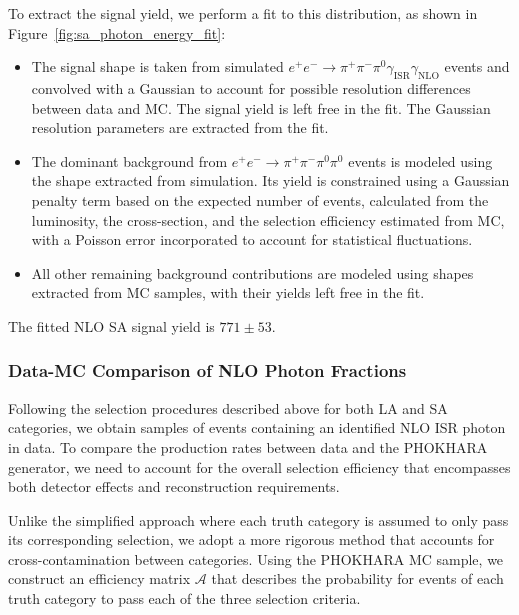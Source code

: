 To extract the signal yield, we perform a fit to this distribution, as shown in Figure~\ref{fig:sa_photon_energy_fit}:
\begin{itemize}
    \item The signal shape is taken from simulated \(e^+e^- \to \pi^+\pi^-\pi^0\gamma_{\text{ISR}}\gamma_{\text{NLO}}\) events and convolved with a Gaussian to account for possible resolution differences between data and MC. The signal yield is left free in the fit. The Gaussian resolution parameters are extracted from the fit.
    \item The dominant background from \(e^+e^- \to \pi^+\pi^-\pi^0\pi^0\) events is modeled using the shape extracted from simulation. Its yield is constrained using a Gaussian penalty term based on the expected number of events, calculated from the luminosity, the cross-section, and the selection efficiency estimated from MC, with a Poisson error incorporated to account for statistical fluctuations.
    \item All other remaining background contributions are modeled using shapes extracted from MC samples, with their yields left free in the fit.
\end{itemize}

The fitted NLO SA signal yield is $771 \pm 53$.

\subsubsection{Data-MC Comparison of NLO Photon Fractions}

Following the selection procedures described above for both LA and SA categories, we obtain samples of events containing an identified NLO ISR photon in data. To compare the production rates between data and the PHOKHARA generator, we need to account for the overall selection efficiency that encompasses both detector effects and reconstruction requirements.

Unlike the simplified approach where each truth category is assumed to only pass its corresponding selection, we adopt a more rigorous method that accounts for cross-contamination between categories. Using the PHOKHARA MC sample, we construct an efficiency matrix $\mathcal{A}$ that describes the probability for events of each truth category to pass each of the three selection criteria.

